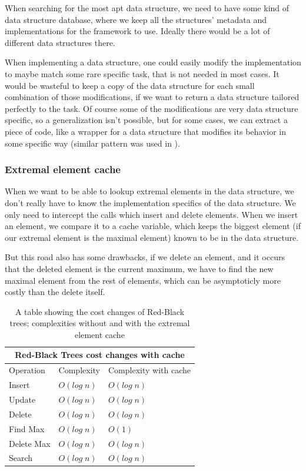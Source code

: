 \documentclass[a4paper,11pt]{article}
\begin{document}
		When searching for the most apt data structure, we need to have some kind of data structure database,
		where we keep all the structures' metadata and implementations for the framework to use. Ideally there
		would be a lot of different data structures there.

		When implementing a data structure, one could easily modify the implementation to maybe match some rare
		specific task, that is not needed in most cases. It would be wasteful to keep a copy of the data
		structure for each small combination of those modifications, if we want to return a data structure
		tailored perfectly to the task. Of course some of the modifications are very data structure specific, so
		a generalization isn't possible, but for some cases, we can extract a piece of code, like a wrapper for
        a data structure that modifies its behavior in some specific way (similar pattern was used in
        \cite{Okasaki}).

		\subsubsection{Extremal element cache}

			When we want to be able to lookup extremal elements in the data structure, we don't really have
			to know the implementation specifics of the data structure. We only need to intercept the calls
			which insert and delete elements. When we insert an element, we compare it to a cache variable,
			which keeps the biggest element (if our extremal element is the maximal element) known to be in
			the data structure.

			But this road also has some drawbacks, if we delete an element, and it occurs that the deleted
			element is the current maximum, we have to find the new maximal element from the rest of
			elements, which can be asymptoticly more costly than the delete itself.

				\begin{table}[h!]
				\centering
				\begin{tabular}{|l|l|l|}
					\hline
					\multicolumn{3}{|c|}{Red-Black Trees cost changes with cache} \\
					\hline
					Operation & Complexity & Complexity with cache \\
					\hline
					Insert 	        & $O(log \; n)$ & $O(log \; n)$ \\
					Update          & $O(log \; n)$ & $O(log \; n)$ \\
					Delete	        & $O(log \; n)$ & $O(log \; n)$ \\
					Find Max 	& $O(log \; n)$ & {\color{darkgreen}$O(1)$}\\
					Delete Max	& $O(log \; n)$ & $O(log \; n)$ \\
					Search 		& $O(log \; n)$ & $O(log \; n)$ \\
					\hline
				\end{tabular}
				\caption{A table showing the cost changes of Red-Black trees; complexities without and with the
				extremal element cache}
				\label{tab:rbt-cost-change}
			\end{table}
\end{document}
